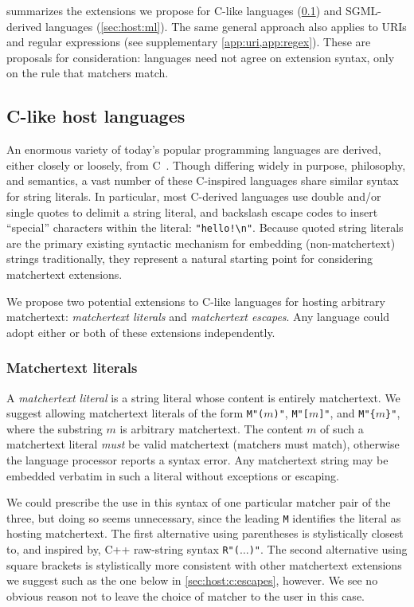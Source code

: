  summarizes the extensions we propose
for C-like languages (\cref{sec:host:c})
and SGML-derived languages (\cref{sec:host:ml}).
The same general approach also applies to URIs and regular expressions
(see supplementary \cref{app:uri,app:regex}).
These are proposals for consideration:
languages need not agree on extension syntax,
only on the rule that matchers match.


\subsection{C-like host languages}
\label{sec:host:c}

An enormous variety of today's popular programming languages
are derived, either closely or loosely, from C~\cite{kernighan88c}.
Though differing widely in purpose, philosophy, and semantics,
a vast number of these C-inspired languages share similar syntax
for string literals.
In particular, most C-derived languages use
double and/or single quotes to delimit a string literal,
and backslash escape codes to insert ``special'' characters within the literal:
\eg \verb|"hello!\n"|.
Because quoted string literals
are the primary existing syntactic mechanism
for embedding (non-matchertext) strings traditionally,
they represent a natural starting point for considering matchertext extensions.

We propose two potential extensions to C-like languages
for hosting arbitrary matchertext:
\emph{matchertext literals} and \emph{matchertext escapes}.
Any language could adopt
either or both of these extensions independently.

\subsubsection{Matchertext literals}
\label{sec:host:c:literals}

A \emph{matchertext literal} is a string literal
whose content is entirely matchertext.
We suggest allowing matchertext literals of the form
\verb|M"(|$m$\verb|)"|,
\verb|M"[|$m$\verb|]"|, and
\verb|M"{|$m$\verb|}"|,
where the substring $m$ is arbitrary matchertext.
The content $m$ of such a matchertext literal
\emph{must} be valid matchertext (matchers must match),
otherwise the language processor reports a syntax error.
Any matchertext string may be embedded verbatim in such a literal
without exceptions or escaping.

We could prescribe the use in this syntax
of one particular matcher pair of the three,
but doing so seems unnecessary,
since the leading \verb|M| identifies the literal as hosting matchertext.
The first alternative using parentheses is stylistically closest to,
and inspired by,
C++ raw-string syntax \verb|R"(|$\dots$\verb|)"|.
The second alternative using square brackets
is stylistically more consistent with other matchertext extensions we suggest
such as the one below in \cref{sec:host:c:escapes}, however.
We see no obvious reason not to leave the choice of matcher to the user
in this case.

